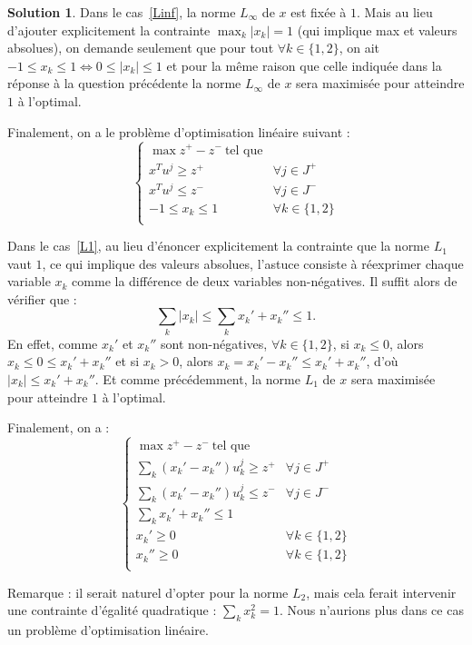 \documentclass[a4paper,francais]{article}
\theoremstyle{definition}
\newtheorem*{solution}{Solution}
\begin{document}
\begin{solution}
  Dans le cas~\ref{Linf}, la norme $L_\infty$ de $x$ est fixée à $1$.
  Mais au lieu d'ajouter explicitement la contrainte $\max_k |x_k| = 1$
  (qui implique max et valeurs absolues),
  on demande seulement que pour tout $\forall k \in \{1, 2\}$, on ait
  $-1 \leq x_k \leq 1 \Leftrightarrow 0 \leq |x_k| \leq 1$ et pour la même
  raison que celle indiquée dans la réponse à la question précédente
  la norme $L_\infty$ de $x$ sera maximisée pour atteindre $1$ à l'optimal.
  
  Finalement, on a le problème d'optimisation linéaire suivant :  
  \[
  \left\{
  \begin{array}{ll}
    \max z^+ - z^- \ \text{tel que} & \\
    x^T u^j \geq z^+ & \forall j \in J^+ \\ 
    x^T u^j \leq z^- & \forall j \in J^- \\
    -1 \leq x_k \leq 1 & \forall k \in \{1, 2\} \\
  \end{array}
  \right.
  \]

  Dans le cas~\ref{L1}, au lieu d'énoncer explicitement la contrainte
  que la norme $L_1$ vaut $1$, ce qui implique des valeurs absolues, l'astuce consiste
  à réexprimer chaque variable $x_k$ comme la différence de deux variables non-négatives.
  Il suffit alors de vérifier que :
  \[ \sum_k |x_k| \leq \sum_k x_k' + x_k'' \leq 1. \]
  En effet, comme $x_k'$ et $x_k''$ sont non-négatives, $\forall k \in \{1, 2\}$,
  si $x_k \leq 0$, alors $x_k \leq 0 \leq x_k' + x_k''$
  et si $x_k > 0$, alors $x_k = x_k' - x_k'' \leq x_k' + x_k''$,
  d'où $|x_k| \leq x_k' + x_k''$.
  Et comme précédemment, la norme $L_1$ de $x$ sera maximisée pour atteindre $1$ à l'optimal.
  
  Finalement, on a : 
  \[
  \left\{
  \begin{array}{ll}
    \max z^+ - z^- \ \text{tel que} & \\
    \sum_k (x_k' - x_k'') u_k^j \geq z^+ & \forall j \in J^+ \\ 
    \sum_k (x_k' - x_k'') u_k^j \leq z^- & \forall j \in J^- \\
    \sum_k x_k' + x_k'' \leq 1 \\
    x_k' \geq 0 & \forall k \in \{1, 2\} \\
    x_k'' \geq 0 & \forall k \in \{1, 2\} \\
  \end{array}
  \right.
  \]
  
  Remarque : il serait naturel d'opter pour la norme $L_2$, mais cela ferait intervenir
  une contrainte d'égalité quadratique : $\sum_k x_k^2 = 1$. Nous n'aurions plus dans
  ce cas un problème d'optimisation linéaire. 
\end{solution}
\end{document}
